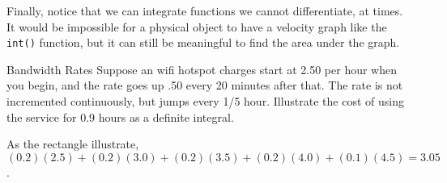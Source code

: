 Finally, notice that we can integrate functions we cannot differentiate, at times.  It would
be impossible for a physical object to have a velocity graph like the \texttt{int()} function,
but it can still be meaningful to find the area under the graph.

\begin{example}{Bandwidth Rates}
\exProblem
Suppose an wifi hotspot charges start at 2.50 per hour when you begin, and the rate goes
up .50 every 20 minutes after that.  The rate is not incremented
continuously, but jumps every 1/5 hour.  Illustrate the cost of using the service for 0.9 hours
as a definite integral.

\exSolution
{}
As the rectangle illustrate, $(0.2)(2.5) + (0.2)(3.0) + (0.2)(3.5) + (0.2)(4.0) + (0.1)(4.5) = 3.05$.
\end{example}

